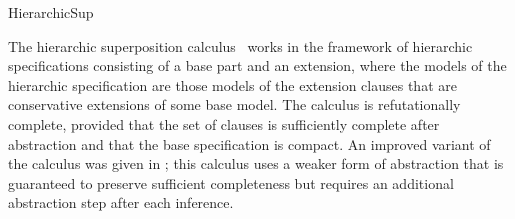 \begin{entry}{HierarchicSup}
\begin{history}
The hierarchic superposition calculus~\cite{BachmairGanzingerWaldmann1992ALP,BachmairGanzingerWaldmann1994AAECC}
works in the framework of hierarchic specifications
consisting of a base part and an extension,
where the models of the hierarchic specification
are those models of the extension clauses that
are conservative extensions of some base model.
The calculus is refutationally complete,
provided that the set of clauses is sufficiently
complete after abstraction and that the base specification is compact.
An improved variant of the calculus
was given in \cite{BaumgartnerWaldmann2013CADE};
this calculus uses a weaker form of abstraction that is
guaranteed to preserve sufficient completeness
but requires an additional abstraction step after each inference.

\end{history}




%
%
%
%
%
%
% 
%












\end{entry}
